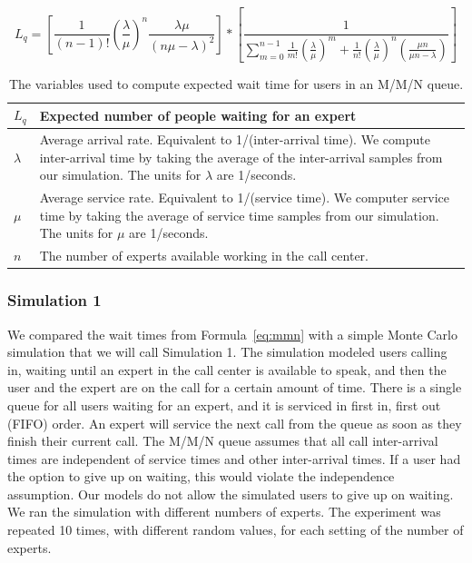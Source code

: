 \begin{equation}
  L_q = \left[ \frac{1}{(n - 1)!} \left( \frac{\lambda}{\mu} \right)^n
    \frac{\lambda \mu}{(n \mu - \lambda)^2} \right] *
  \left[ \frac{1}{\sum_{m=0}^{n-1} \frac{1}{m!} \left( \frac{\lambda}{\mu}
      \right)^m + \frac{1}{n!} \left( \frac{\lambda}{\mu} \right)^n
    \left( \frac{\mu n}{\mu n - \lambda} \right) } \right]
  \label{eq:num_waiting}
\end{equation}

\begin{table}
  \begin{tabular}{|l|p{5.8in}|}
    \hline
    $L_q$ & Expected number of people waiting for an expert\\
    \hline
    $\lambda$ & Average arrival rate. Equivalent to 1/(inter-arrival time).
                We compute inter-arrival time by taking the average of the
                inter-arrival samples from our simulation.
                The units for $\lambda$ are 1/seconds.\\
    \hline
    $\mu$ & Average service rate. Equivalent to 1/(service time).
            We computer service time by taking the average of service time
            samples from our simulation.
            The units for $\mu$ are 1/seconds.\\
    \hline
    $n$ & The number of experts available working in the call center.\\
    \hline
  \end{tabular}
  \caption{The variables used to compute expected wait time for users in an
  M/M/N queue.}\label{tab:vars}
\end{table}

\subsubsection{Simulation 1}

We compared the wait times from Formula~\ref{eq:mmn} with a simple Monte Carlo
simulation that we will call Simulation 1.
The simulation modeled users calling in, waiting until an expert in the
call center is available to speak, and then the user and the expert are on the
call for a certain amount of time.
There is a single queue for all users waiting for an expert, and it is serviced
in first in, first out (FIFO) order.
An expert will service the next call from the queue as soon as they finish their
current call.
The M/M/N queue assumes that all call inter-arrival times are independent of
service times and other inter-arrival times.
If a user had the option to give up on waiting, this would violate the
independence assumption.
Our models do not allow the simulated users to give up on waiting.
We ran the simulation with different numbers of experts.
The experiment was repeated 10 times, with different random values, for each
setting of the number of experts.

